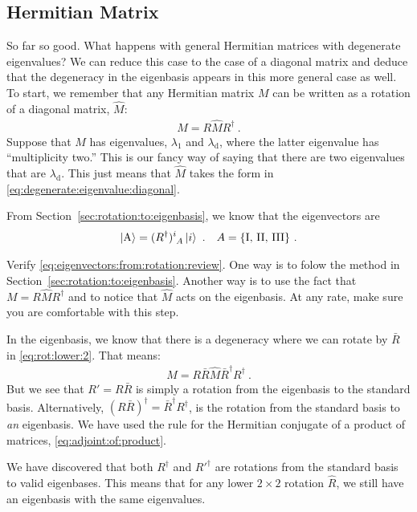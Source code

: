 \documentclass[12pt, oneside]{report}    %
\begin{document}
\subsection*{Hermitian Matrix}

So far so good. What happens with general Hermitian matrices with degenerate eigenvalues? We can reduce this case to the case of a diagonal matrix and deduce that the degeneracy in the eigenbasis appears in this more general case as well. To start, we remember that any Hermitian matrix $M$ can be written as a rotation of a diagonal matrix, $\hat M$: 
\begin{align}
    M = R \hat M R^\dag \ .
\end{align}
Suppose that $M$ has eigenvalues, $\lambda_1$ and $\lambda_\text{d}$, where the latter eigenvalue has ``multiplicity two.'' This is our fancy way of saying that there are two eigenvalues that are $\lambda_\text{d}$. This just means that $\hat M$ takes the form in \eqref{eq:degenerate:eigenvalue:diagonal}. 

From Section~\ref{sec:rotation:to:eigenbasis}, we know that the eigenvectors are 
\begin{align}
    \ket{\text{A}} &= (R^\dag)\aij{i}{A}\ket{i} \ .
    &
    A = \{\text{I, II, III}\} \ .
    \label{eq:eigenvectors:from:rotation:review}
\end{align}
\begin{exercise}
Verify \eqref{eq:eigenvectors:from:rotation:review}. One way is to folow the method in Section~\ref{sec:rotation:to:eigenbasis}. Another way is to use the fact that $M = R\hat{M}R^\dag$ and to notice that $\hat M$ acts on the eigenbasis. At any rate, make sure you are comfortable with this step. 
\end{exercise}
In the eigenbasis, we know that there is a degeneracy where we can rotate by $\bar R$ in \eqref{eq:rot:lower:2}. That means:
\begin{align}
    M = R \bar R\hat M \bar R^\dag R^\dag \ .
\end{align}
But we see that $R'= R\bar{R}$ is simply a rotation from the eigenbasis to the standard basis. Alternatively, $(R\bar R)^\dag = \bar R^\dag R^\dag$, is the rotation from the standard basis to \emph{an} eigenbasis. We have used the rule for the Hermitian conjugate of a product of matrices, \eqref{eq:adjoint:of:product}. 

We have discovered that both $R^\dag$ and $R'^\dag$ are rotations from the standard basis to valid eigenbases. This means that for any lower $2\times 2$ rotation $\hat R$, we still have an eigenbasis with the same eigenvalues. 
\end{document}
